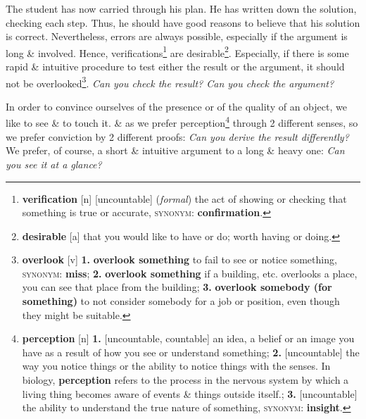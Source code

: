\documentclass[oneside]{book}
\numberwithin{equation}{section}
\begin{document}
The student has now carried through his plan. He has written down the solution, checking each step. Thus, he should have good reasons to believe that his solution is correct. Nevertheless, errors are always possible, especially if the argument is long \& involved. Hence, verifications\footnote{\textbf{verification} [n] [uncountable] (\textit{formal}) the act of showing or checking that something is true or accurate, \textsc{synonym}: \textbf{confirmation}.} are desirable\footnote{\textbf{desirable} [a] that you would like to have or do; worth having or doing.}. Especially, if there is some rapid \& intuitive procedure to test either the result or the argument, it should not be overlooked\footnote{\textbf{overlook} [v] \textbf{1.} \textbf{overlook something} to fail to see or notice something, \textsc{synonym}: \textbf{miss}; \textbf{2.} \textbf{overlook something} if a building, etc. overlooks a place, you can see that place from the building; \textbf{3.} \textbf{overlook somebody (for something)} to not consider somebody for a job or position, even though they might be suitable.}. \textit{Can you check the result? Can you check the argument?}

In order to convince ourselves of the presence or of the quality of an object, we like to see \& to touch it. \& as we prefer perception\footnote{\textbf{perception} [n] \textbf{1.} [uncountable, countable] an idea, a belief or an image you have as a result of how you see or understand something; \textbf{2.} [uncountable] the way you notice things or the ability to notice things with the senses. In biology, \textbf{perception} refers to the process in the nervous system by which a living thing becomes aware of events \& things outside itself.; \textbf{3.} [uncountable] the ability to understand the true nature of something, \textsc{synonym}: \textbf{insight}.} through 2 different senses, so we prefer conviction by 2 different proofs: \textit{Can you derive the result differently?} We prefer, of course, a short \& intuitive argument to a long \& heavy one: \textit{Can you see it at a glance?}
\end{document}
